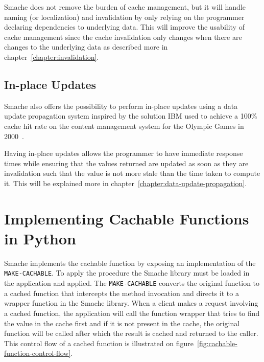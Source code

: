 Smache does not remove the burden of cache management, but it will handle naming (or localization) and invalidation by only relying on the programmer declaring dependencies to underlying data. This will improve the usability of cache management since the cache invalidation only changes when there are changes to the underlying data as described more in chapter~\ref{chapter:invalidation}.


\subsection{In-place Updates}
\label{subsec:write-through-updates}

Smache also offers the possibility to perform in-place updates using a data update propagation system inspired by the solution IBM used to achieve a 100\% cache hit rate on the content management system for the Olympic Games in 2000~\cite{paper:ibm, paper:ibm-extended}.

Having in-place updates allows the programmer to have immediate response times while ensuring that the values returned are updated as soon as they are invalidation such that the value is not more stale than the time taken to compute it. This will be explained more in chapter~\ref{chapter:data-update-propagation}.


\section{Implementing Cachable Functions in Python}
\label{sec:implementing_cachable_functions_in_python}

Smache implements the cachable function by exposing an implementation of the \verb$MAKE-CACHABLE$. To apply the procedure the Smache library must be loaded in the application and applied. The \verb$MAKE-CACHABLE$ converts the original function to a cached function that intercepts the method invocation and directs it to a wrapper function in the Smache library. When a client makes a request involving a cached function, the application will call the function wrapper that tries to find the value in the cache first and if it is not present in the cache, the original function will be called after which the result is cached and returned to the caller. This control flow of a cached function is illustrated on figure~\ref{fig:cachable-function-control-flow}.

